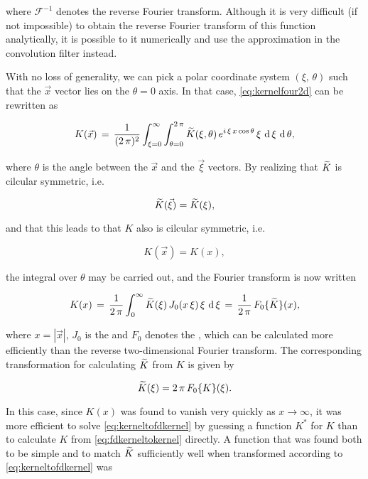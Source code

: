 where $\mathcal{F}^{-1}$ denotes the reverse Fourier transform. Although it is very difficult (if not impossible) to obtain the reverse Fourier transform of this function analytically, it is possible to  it numerically and use the approximation in the convolution filter instead.

With no loss of generality, we can pick a polar coordinate system $(\xi,\,\theta)$ such that the $\vec{x}$ vector lies on the $\theta = 0$ axis. In that case, \eqref{eq:kernelfour2d} can be rewritten as

\begin{equation}
K(\vec{x})\, = \,\frac{1}{(2\,\pi)^2}\int_{\xi=0}^\infty\int_{\theta=0}^{2\,\pi}\widetilde{K}(\xi, \theta)\,e^{i\,\xi\,x\cos\theta}\,\xi\,\operatorname{d}\xi\,\operatorname{d}\theta,
\end{equation}

where $\theta$ is the angle between the $\vec{x}$ and the $\vec{\xi}$ vectors. By realizing that $\widetilde{K}$ is cilcular symmetric, i.e.

\begin{equation}
\widetilde{K}(\vec{\xi}) = \widetilde{K}(\xi),
\end{equation}

and that this leads to that $K$ also is cilcular symmetric, i.e.

\begin{equation}
K(\vec{x}) = K(x),
\end{equation}

the integral over $\theta$ may be carried out, and the Fourier transform is now written

\begin{equation} \label{eq:fdkerneltokernel}
K(x)\, = \,\frac{1}{2\,\pi}\int_0^\infty\widetilde{K}(\xi)\,J_0(x\,\xi)\,\xi\,\operatorname{d}\xi\, = \,\frac{1}{2\,\pi}\,F_0\{\widetilde{K}\}(x),
\end{equation}

where $x = |\vec{x}|$, $J_0$ is the  and $F_0$ denotes the , which can be calculated more efficiently than the reverse two-dimensional Fourier transform. The corresponding transformation for calculating $\widetilde{K}$ from $K$ is given by

\begin{equation} \label{eq:kerneltofdkernel}
\widetilde{K}(\xi) = 2\,\pi\,F_0\{K\}(\xi).
\end{equation}

In this case, since $K(x)$ was found to vanish very quickly as $x\rightarrow\infty$, it was more efficient to solve \eqref{eq:kerneltofdkernel} by guessing a function $K^*$ for $K$ than to calculate $K$ from \eqref{eq:fdkerneltokernel} directly. A function that was found both to be simple and to match $\widetilde{K}$ sufficiently well when transformed according to \eqref{eq:kerneltofdkernel} was

